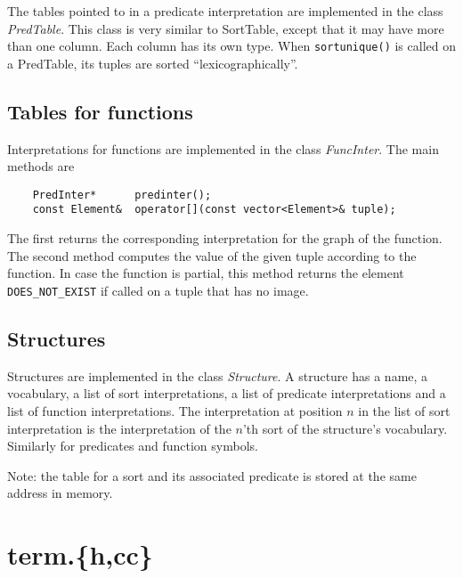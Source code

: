 \documentclass{article}
\begin{document}
The tables pointed to in a predicate interpretation are implemented in the class \emph{PredTable}. This class is very similar to SortTable, except that it may have more than one column. Each column has its own type. When \texttt{sortunique()} is called on a PredTable, its tuples are sorted ``lexicographically''. 

\subsection*{Tables for functions}

Interpretations for functions are implemented in the class \emph{FuncInter}. The main methods are
\begin{lstlisting}
	PredInter*      predinter();
	const Element&  operator[](const vector<Element>& tuple);
\end{lstlisting}
The first returns the corresponding interpretation for the graph of the function. The second method computes the value of the given tuple according to the function. In case the function is partial, this method returns the element \texttt{DOES\_NOT\_EXIST} if called on a tuple that has no image.

\subsection*{Structures}

Structures are implemented in the class \emph{Structure}. A structure has a name, a vocabulary, a list of sort interpretations, a list of predicate interpretations and a list of function interpretations. The interpretation at position $n$ in the list of sort interpretation is the interpretation of the $n$'th sort of the structure's vocabulary. Similarly for predicates and function symbols. 

Note: the table for a sort and its associated predicate is stored at the same address in memory. 

\section{term.\{h,cc\}}
\end{document}

